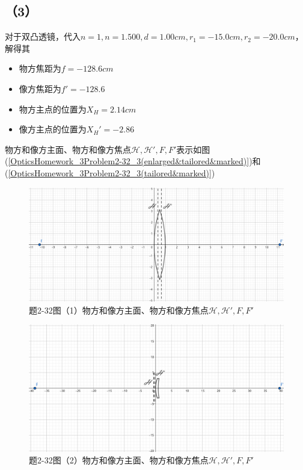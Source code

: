 \documentclass[10pt,a4paper]{article}
\theoremstyle{remark}
\begin{document}
\subsection*{（3）}
对于双凸透镜，代入$n = 1, n = 1.500, d = 1.00cm, r_1 = -15.0cm, r_2 = -20.0cm$，解得其
\begin{itemize}
  \item 物方焦距为$f = -128.6cm$
  \item 像方焦距为$f' = -128.6$
  \item 物方主点的位置为$X_H = 2.14cm$
  \item 像方主点的位置为$X_H' = -2.86$
\end{itemize}
物方和像方主面、物方和像方焦点$\mathscr{H},\mathscr{H}',F,F'$表示如图(\ref{OpticsHomework_3Problem2-32_3(enlarged&tailored&marked)})和(\ref{OpticsHomework_3Problem2-32_3(tailored&marked)})
\begin{figure}[h]
\centering
\includegraphics[scale=.2]{OpticsHomework_3Problem_2-32_1(tailored&marked).png}
\caption{题2-32图（1）物方和像方主面、物方和像方焦点$\mathscr{H},\mathscr{H}',F,F'$}\label{OpticsHomework_3Problem2-32_1(tailored&marked)}
\end{figure}
\begin{figure}[h]
\centering
\includegraphics[scale=.2]{OpticsHomework_3Problem_2-32_2(tailored&marked).png}
\caption{题2-32图（2）物方和像方主面、物方和像方焦点$\mathscr{H},\mathscr{H}',F,F'$}\label{OpticsHomework_3Problem2-32_2(tailored&marked)}
\end{figure}
\end{document}
